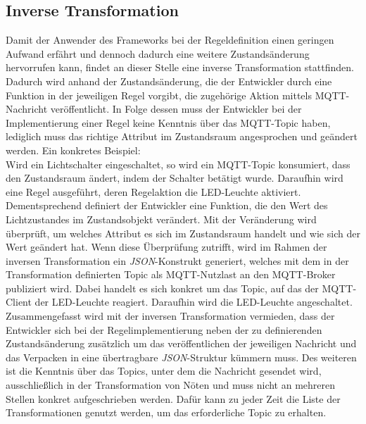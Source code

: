 \subsection{Inverse Transformation}
\label{subsec:inverseTransformation}
    Damit der Anwender des Frameworks bei der Regeldefinition einen geringen Aufwand erfährt und dennoch dadurch eine weitere 
    Zustandsänderung hervorrufen kann, findet an dieser Stelle eine inverse Transformation stattfinden. Dadurch wird anhand 
    der Zustandsänderung, die der Entwickler durch eine Funktion in der jeweiligen Regel vorgibt, die zugehörige Aktion mittels \acs{MQTT}-Nachricht 
    veröffentlicht. In Folge dessen muss der Entwickler bei der Implementierung einer Regel keine Kenntnis über das 
    \acs{MQTT}-Topic haben, lediglich muss das richtige Attribut im Zustandsraum angesprochen und geändert werden. 
    Ein konkretes Beispiel: 
    \\
    \linebreak
    Wird ein Lichtschalter eingeschaltet, so wird ein \acs{MQTT}-Topic konsumiert, dass den Zustandsraum ändert, indem 
    der Schalter betätigt wurde. Daraufhin wird eine Regel ausgeführt, deren Regelaktion die LED-Leuchte aktiviert. 
    Dementsprechend definiert der Entwickler eine Funktion, die den Wert des Lichtzustandes im Zustandsobjekt verändert. 
    Mit der Veränderung wird überprüft, um welches Attribut es sich im Zustandsraum handelt und wie sich der Wert geändert hat. 
    Wenn diese Überprüfung zutrifft, wird im Rahmen der inversen Transformation ein \textit{JSON}-Konstrukt generiert, welches 
    mit dem in der Transformation definierten Topic als \acs{MQTT}-Nutzlast an den \acs{MQTT}-Broker publiziert wird. Dabei handelt 
    es sich konkret um das Topic, auf das der \acs{MQTT}-Client der LED-Leuchte reagiert.
    Daraufhin wird die LED-Leuchte angeschaltet. 
    \\
    \linebreak
    Zusammengefasst wird mit der inversen Transformation vermieden, dass der Entwickler sich bei der Regelimplementierung neben der zu definierenden 
    Zustandsänderung zusätzlich um das veröffentlichen der jeweiligen Nachricht und das Verpacken in eine übertragbare 
    \textit{JSON}-Struktur kümmern muss. Des weiteren ist die Kenntnis über das Topics, unter dem die Nachricht 
    gesendet wird, ausschließlich in der Transformation von Nöten und muss nicht an mehreren Stellen konkret 
    aufgeschrieben werden. Dafür kann zu jeder Zeit die Liste der Transformationen genutzt werden, um das erforderliche Topic zu erhalten. 
